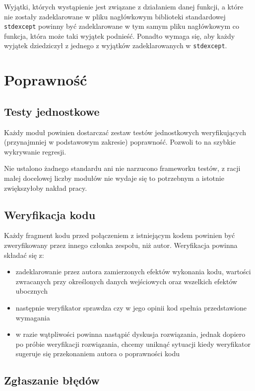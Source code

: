 \documentclass[a4paper]{article}
\begin{document}
Wyjątki, których wystąpienie jest związane z działaniem danej funkcji, a które nie zostały zadeklarowane w pliku nagłówkowym biblioteki standardowej \verb+stdexcept+ powinny być zadeklarowane w tym samym pliku nagłówkowym co funkcja, która może taki wyjątek podnieść. Ponadto wymaga się, aby każdy wyjątek dziedziczył z jednego z wyjątków zadeklarowanych w \verb+stdexcept+.

\section{Poprawność}

\subsection{Testy jednostkowe}

Każdy moduł powinien dostarczać zestaw testów jednostkowych weryfikujących (przynajmniej w podstawowym zakresie) poprawność. Pozwoli to na szybkie wykrywanie regresji.

Nie ustalono żadnego standardu ani nie narzucono frameworku testów, z racji małej docelowej liczby modułów nie wydaje się to potrzebnym a istotnie zwiększyłoby nakład pracy.

\subsection{Weryfikacja kodu}

Każdy fragment kodu przed połączeniem z istniejącym kodem powinien być zweryfikowany przez innego członka zespołu, niż autor. Weryfikacja powinna składać się z:
\begin{itemize}
\item zadeklarowanie przez autora zamierzonych efektów wykonania kodu, wartości zwracanych przy określonych danych wejściowych oraz wszelkich efektów ubocznych
\item następnie weryfikator sprawdza czy w jego opinii kod spełnia przedstawione wymagania
\item w razie wątpliwości powinna nastąpić dyskusja rozwiązania, jednak dopiero po próbie weryfikacji rozwiązania, chcemy uniknąć sytuacji kiedy weryfikator sugeruje się przekonaniem autora o poprawności kodu
\end{itemize}

\subsection{Zgłaszanie błędów}
\end{document}
